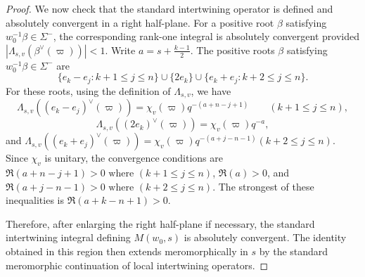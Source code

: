 \documentclass[11pt,notitlepage]{amsart}
\theoremstyle{definition}
\theoremstyle{remark}
\begin{document}
\begin{proof}
We now check that the standard intertwining operator is defined and absolutely
convergent in a right half-plane. For a positive root \(\beta\) satisfying
\(w_0^{-1}\beta\in\Sigma^-\), the corresponding rank-one integral is absolutely
convergent provided
$\left|\Lambda_{s,v}(\beta^\vee(\varpi))\right|<1$. Write $a=s+\frac{k-1}{2}$.
The positive roots \(\beta\) satisfying \(w_0^{-1}\beta\in\Sigma^-\) are
\[
\{e_k-e_j:k+1\le j\le n\}
\cup
\{2e_k\}
\cup
\{e_k+e_j:k+2\le j\le n\}.
\]
For these roots, using the definition of \(\Lambda_{s,v}\), we have
\[
\Lambda_{s,v}((e_k-e_j)^\vee(\varpi))
=
\chi_v(\varpi)q^{-(a+n-j+1)}
\qquad(k+1\le j\le n),
\]
\[
\Lambda_{s,v}((2e_k)^\vee(\varpi))
=
\chi_v(\varpi)q^{-a},
\]
and $\Lambda_{s,v}((e_k+e_j)^\vee(\varpi))
=
\chi_v(\varpi)q^{-(a+j-n-1)}
(k+2\le j\le n)$.
Since \(\chi_v\) is unitary, the convergence conditions are $\Re(a+n-j+1)>0\text{ where }(k+1\le j\le n)$,
$\Re(a)>0$, and $\Re(a+j-n-1)>0\text{ where }(k+2\le j\le n)$. The strongest of these inequalities is $\Re(a+k-n+1)>0$.

Therefore, after enlarging the right half-plane if necessary, the standard
intertwining integral defining \(M(w_0,s)\) is absolutely convergent. The
identity obtained in this region then extends meromorphically in \(s\) by the
standard meromorphic continuation of local intertwining operators.


\end{proof}
\end{document}

